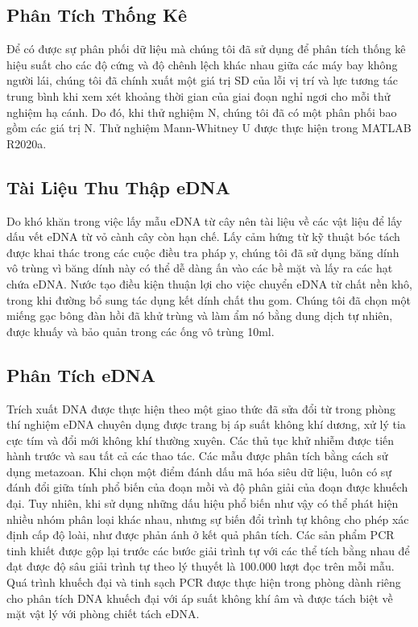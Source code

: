 \documentclass[12pt,a4paper]{article}
\begin{document}
\subsection{Phân Tích Thống Kê}
Để có được sự phân phối dữ liệu mà chúng tôi đã sử dụng để phân tích thống kê hiệu suất cho các độ cứng và độ chênh lệch khác nhau giữa các máy bay không người lái, chúng tôi đã chính xuất một giá trị SD của lỗi vị trí và lực tương tác trung bình khi xem xét khoảng thời gian của giai đoạn nghỉ ngơi cho mỗi thử nghiệm hạ cánh. Do đó, khi thử nghiệm N, chúng tôi đã có một phân phối bao gồm các giá trị N. Thử nghiệm Mann-Whitney U được thực hiện trong MATLAB R2020a.\\
\subsection{Tài Liệu Thu Thập eDNA}
Do khó khăn trong việc lấy mẫu eDNA từ cây nên tài liệu về các vật liệu để lấy dấu vết eDNA từ vỏ cành cây còn hạn chế. Lấy cảm hứng từ kỹ thuật bóc tách được khai thác trong các cuộc điều tra pháp y, chúng tôi đã sử dụng băng dính vô trùng vì băng dính này có thể dễ dàng ấn vào các bề mặt và lấy ra các hạt chứa eDNA. Nước tạo điều kiện thuận lợi cho việc chuyển eDNA từ chất nền khô, trong khi đường bổ sung tác dụng kết dính chất thu gom. Chúng tôi đã chọn một miếng gạc bông đàn hồi đã khử trùng và làm ẩm nó bằng dung dịch tự nhiên, được khuấy và bảo quản trong các ống vô trùng 10ml.\\
\subsection{Phân Tích eDNA}
Trích xuất DNA được thực hiện theo một giao thức đã sửa đổi từ trong phòng thí nghiệm eDNA chuyên dụng được trang bị áp suất không khí dương, xử lý tia cực tím và đổi mới không khí thường xuyên. Các thủ tục khử nhiễm được tiến hành trước và sau tất cả các thao tác. Các mẫu được phân tích bằng cách sử dụng metazoan. Khi chọn một điểm đánh dấu mã hóa siêu dữ liệu, luôn có sự đánh đổi giữa tính phổ biến của đoạn mồi và độ phân giải của đoạn được khuếch đại. Tuy nhiên, khi sử dụng những dấu hiệu phổ biến như vậy có thể phát hiện nhiều nhóm phân loại khác nhau, nhưng sự biến đổi trình tự không cho phép xác định cấp độ loài, như được phản ánh ở kết quả phân tích. Các sản phẩm PCR tinh khiết được gộp lại trước các bước giải trình tự với các thể tích bằng nhau để đạt được độ sâu giải trình tự theo lý thuyết là 100.000 lượt đọc trên mỗi mẫu. Quá trình khuếch đại và tinh sạch PCR được thực hiện trong phòng dành riêng cho phân tích DNA khuếch đại với áp suất không khí âm và được tách biệt về mặt vật lý với phòng chiết tách eDNA. \\
\end{document}
